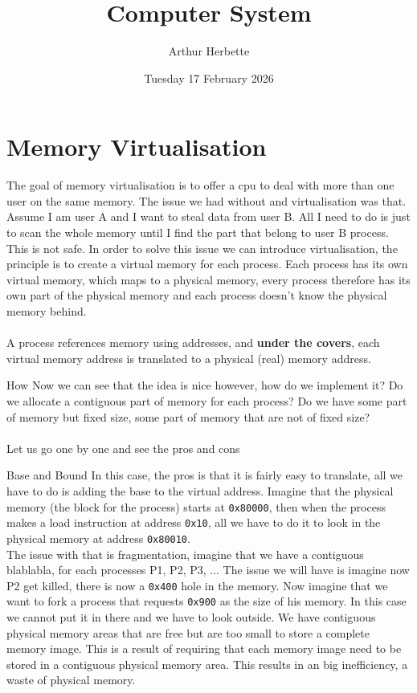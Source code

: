 \documentclass[a4paper]{book}
\title{Computer System}
\author{Arthur Herbette}
\date{Tuesday 17 February 2026}
\begin{document}
\maketitle

\newpage
\tableofcontents
\newpage
\section{Memory Virtualisation}
The goal of memory virtualisation is to offer a cpu to deal with more than one user on the same memory. The issue we had without and virtualisation was that. Assume I am user A and I want to steal data from user B. All I need to do is just to scan the whole memory until I find the part that belong to user B process. This is not safe. In order to solve this issue we can introduce virtualisation, the principle is to create a virtual memory for each process. Each process has its own virtual memory, which maps to a physical memory, every process therefore has its own part of the physical memory and each process doesn't know the physical memory behind.\\
$ $\\
A process references memory using  addresses, and \textbf{under the covers}, each virtual memory address is translated to a physical (real) memory address.
\begin{parag}{How}
    Now we can see that the idea is nice however, how do we implement it? Do we allocate a contiguous part of memory for each process? Do we have some part of memory but fixed size, some part of memory that are not of fixed size?\\
	$ $\\
	Let us go one by one and see the pros and cons
\end{parag}

\begin{parag}{Base and Bound}
    In this case, the pros is that it is fairly easy to translate, all we have to do is adding the base to the virtual address. Imagine that the physical memory (the block for the process) starts at \texttt{0x80000}, then when the process makes a load instruction at address \texttt{0x10}, all we have to do it to look in the physical memory at address \texttt{0x80010}.\\
	The issue with that is fragmentation, imagine that we have a contiguous blablabla, for each processes P1, P2, P3, ... The issue we will have is imagine now P2 get killed, there is now a \texttt{0x400} hole in the memory. Now imagine that we want to fork a process that requests \texttt{0x900} as the size of his memory. In this case we cannot put it in there and we have to look outside. We have contiguous physical memory areas that are free but are too small to store a complete memory image. This is a result of requiring that each memory image need to be stored in a contiguous physical memory area. This results in an big inefficiency, a waste of physical memory.
\end{parag}
\end{document}
